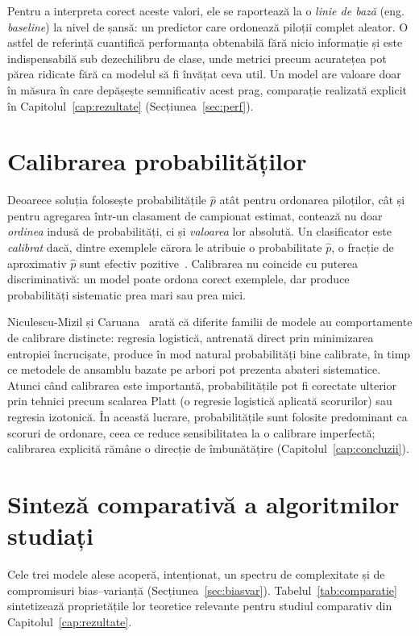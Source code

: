 \documentclass[12pt,a4paper]{report}
\begin{document}
Pentru a interpreta corect aceste valori, ele se raportează la o \emph{linie de bază} (eng.
\emph{baseline}) la nivel de șansă: un predictor care ordonează piloții complet aleator. O astfel de
referință cuantifică performanța obtenabilă fără nicio informație și este indispensabilă sub
dezechilibru de clase, unde metrici precum acuratețea pot părea ridicate fără ca modelul să fi
învățat ceva util. Un model are valoare doar în măsura în care depășește semnificativ acest prag,
comparație realizată explicit în Capitolul~\ref{cap:rezultate} (Secțiunea~\ref{sec:perf}).

\section{Calibrarea probabilităților}
\label{sec:calibrare}

Deoarece soluția folosește probabilitățile $\hat{p}$ atât pentru ordonarea piloților, cât și
pentru agregarea într-un clasament de campionat estimat, contează nu doar \emph{ordinea} indusă
de probabilități, ci și \emph{valoarea} lor absolută. Un clasificator este \emph{calibrat} dacă,
dintre exemplele cărora le atribuie o probabilitate $\hat{p}$, o fracție de aproximativ $\hat{p}$
sunt efectiv pozitive~\cite{niculescu2005predicting}. Calibrarea nu coincide cu puterea
discriminativă: un model poate ordona corect exemplele, dar produce probabilități sistematic prea
mari sau prea mici.

Niculescu-Mizil și Caruana~\cite{niculescu2005predicting} arată că diferite familii de modele au
comportamente de calibrare distincte: regresia logistică, antrenată direct prin minimizarea
entropiei încrucișate, produce în mod natural probabilități bine calibrate, în timp ce
metodele de ansamblu bazate pe arbori pot prezenta abateri sistematice. Atunci când calibrarea
este importantă, probabilitățile pot fi corectate ulterior prin tehnici precum scalarea Platt
(o regresie logistică aplicată scorurilor) sau regresia izotonică. În această lucrare,
probabilitățile sunt folosite predominant ca scoruri de ordonare, ceea ce reduce sensibilitatea
la o calibrare imperfectă; calibrarea explicită rămâne o direcție de îmbunătățire
(Capitolul~\ref{cap:concluzii}).

\section{Sinteză comparativă a algoritmilor studiați}
\label{sec:sinteza}

Cele trei modele alese acoperă, intenționat, un spectru de complexitate și de compromisuri
bias--varianță (Secțiunea~\ref{sec:biasvar}). Tabelul~\ref{tab:comparatie} sintetizează
proprietățile lor teoretice relevante pentru studiul comparativ din Capitolul~\ref{cap:rezultate}.
\end{document}
